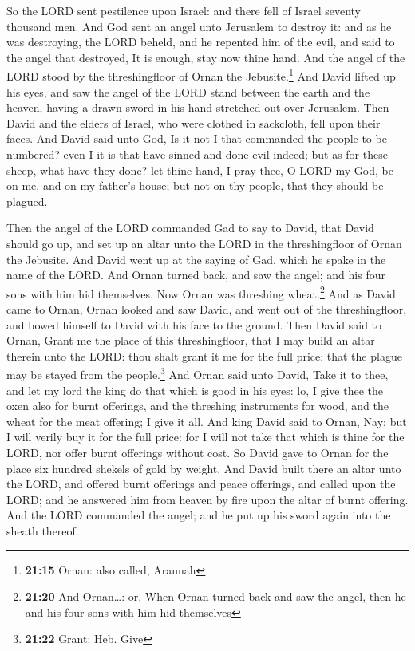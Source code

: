  So the LORD sent pestilence upon Israel: and there fell
of Israel seventy thousand men.  And God sent an angel
unto Jerusalem to destroy it: and as he was destroying, the LORD beheld,
and he repented him of the evil, and said to the angel that destroyed,
It is enough, stay now thine hand. And the angel of the LORD stood by
the threshingfloor of Ornan the Jebusite.\footnote{\textbf{21:15} Ornan:
  also called, Araunah}  And David lifted up his eyes,
and saw the angel of the LORD stand between the earth and the heaven,
having a drawn sword in his hand stretched out over Jerusalem. Then
David and the elders of Israel, who were clothed in sackcloth, fell upon
their faces.  And David said unto God, Is it not I that
commanded the people to be numbered? even I it is that have sinned and
done evil indeed; but as for these sheep, what have they done? let thine
hand, I pray thee, O LORD my God, be on me, and on my father's house;
but not on thy people, that they should be plagued.

 Then the angel of the LORD commanded Gad to say to
David, that David should go up, and set up an altar unto the LORD in the
threshingfloor of Ornan the Jebusite.  And David went up
at the saying of Gad, which he spake in the name of the LORD.
 And Ornan turned back, and saw the angel; and his four
sons with him hid themselves. Now Ornan was threshing wheat.\footnote{\textbf{21:20}
  And Ornan\ldots: or, When Ornan turned back and saw the angel, then he
  and his four sons with him hid themselves}  And as
David came to Ornan, Ornan looked and saw David, and went out of the
threshingfloor, and bowed himself to David with his face to the ground.
 Then David said to Ornan, Grant me the place of this
threshingfloor, that I may build an altar therein unto the LORD: thou
shalt grant it me for the full price: that the plague may be stayed from
the people.\footnote{\textbf{21:22} Grant: Heb. Give} 
And Ornan said unto David, Take it to thee, and let my lord the king do
that which is good in his eyes: lo, I give thee the oxen also for burnt
offerings, and the threshing instruments for wood, and the wheat for the
meat offering; I give it all.  And king David said to
Ornan, Nay; but I will verily buy it for the full price: for I will not
take that which is thine for the LORD, nor offer burnt offerings without
cost.  So David gave to Ornan for the place six hundred
shekels of gold by weight.  And David built there an
altar unto the LORD, and offered burnt offerings and peace offerings,
and called upon the LORD; and he answered him from heaven by fire upon
the altar of burnt offering.  And the LORD commanded the
angel; and he put up his sword again into the sheath thereof.

